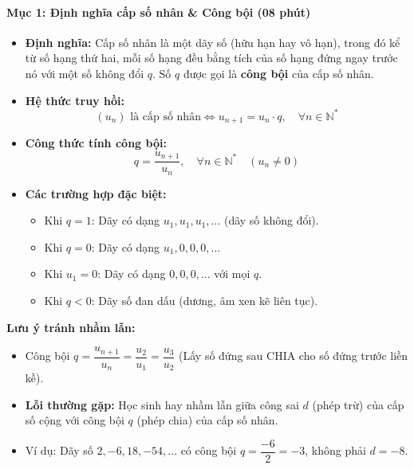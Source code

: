 \documentclass[12pt, a4paper]{article}
\begin{document}
\paragraph{Mục 1: Định nghĩa cấp số nhân & Công bội (08 phút)}
\begin{itemize}
    \item \textbf{Định nghĩa:} Cấp số nhân là một dãy số (hữu hạn hay vô hạn), trong đó kể từ số hạng thứ hai, mỗi số hạng đều bằng tích của số hạng đứng ngay trước nó với một số không đổi $q$.
    Số $q$ được gọi là \textbf{công bội} của cấp số nhân.
    \item \textbf{Hệ thức truy hồi:}
    $$(u_n) \text{ là cấp số nhân} \iff u_{n+1} = u_n \cdot q, \quad \forall n \in \mathbb{N}^*$$
    \item \textbf{Công thức tính công bội:}
    $$q = \dfrac{u_{n+1}}{u_n}, \quad \forall n \in \mathbb{N}^* \quad (u_n \neq 0)$$
    \item \textbf{Các trường hợp đặc biệt:}
    \begin{itemize}
        \item Khi $q = 1$: Dãy có dạng $u_1, u_1, u_1, \dots$ (dãy số không đổi).
        \item Khi $q = 0$: Dãy có dạng $u_1, 0, 0, 0, \dots$
        \item Khi $u_1 = 0$: Dãy có dạng $0, 0, 0, \dots$ với mọi $q$.
        \item Khi $q < 0$: Dãy số đan dấu (dương, âm xen kẽ liên tục).
    \end{itemize}
\end{itemize}


\begin{scaffoldbox}
    \textbf{Lưu ý tránh nhầm lẫn:}
    \begin{itemize}
        \item Công bội $q = \dfrac{u_{n+1}}{u_n} = \dfrac{u_2}{u_1} = \dfrac{u_3}{u_2}$ (Lấy số đứng sau CHIA cho số đứng trước liền kề).
        \item \textbf{Lỗi thường gặp:} Học sinh hay nhầm lẫn giữa công sai $d$ (phép trừ) của cấp số cộng với công bội $q$ (phép chia) của cấp số nhân.
        \item Ví dụ: Dãy số $2, -6, 18, -54, \dots$ có công bội $q = \dfrac{-6}{2} = -3$, không phải $d = -8$.
    \end{itemize}
\end{scaffoldbox}
\end{document}
